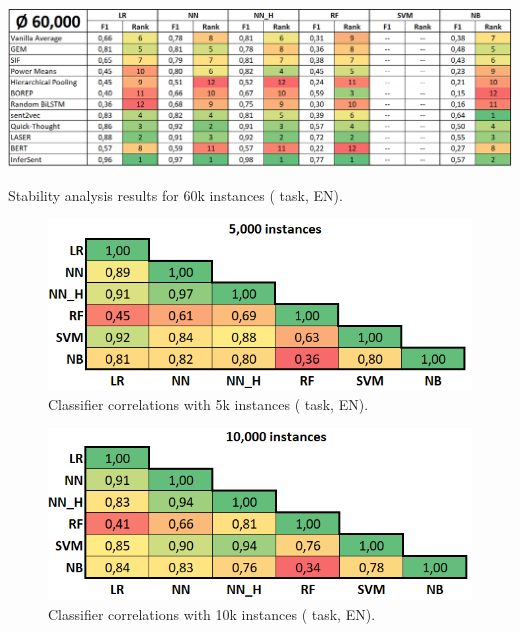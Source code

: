 \begin{table}[H]
	\centering
	\includegraphics[scale=0.475]{images/results_wc_en_60000}
	\caption[Stability analysis results for 60k instances ( task, EN)]
		{Stability analysis results for 60k instances ( task, EN).}
\end{table}

\begin{figure}[H]
	\centering
	\includegraphics[scale=0.5]{images/corr_wc_en_5000}
	\caption[Classifier correlations with 5k instances ( task, EN)]
		{Classifier correlations with 5k instances ( task, EN).}
\end{figure}

\begin{figure}[H]
	\centering
	\includegraphics[scale=0.5]{images/corr_wc_en_10000}
	\caption[Classifier correlations with 10k instances ( task, EN)]
		{Classifier correlations with 10k instances ( task, EN).}
\end{figure}

